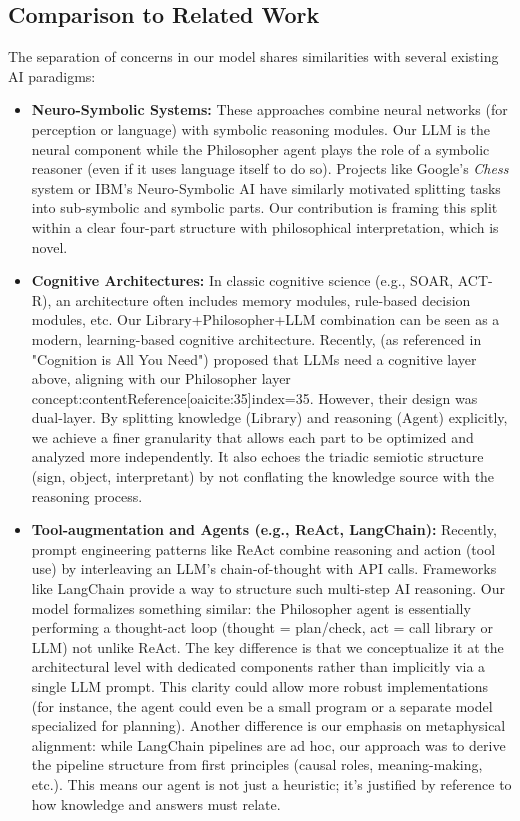\documentclass{article}
\begin{document}
\subsection{Comparison to Related Work}
The separation of concerns in our model shares similarities with several existing AI paradigms:
\begin{itemize}
    \item \textbf{Neuro-Symbolic Systems:} These approaches combine neural networks (for perception or language) with symbolic reasoning modules. Our LLM is the neural component while the Philosopher agent plays the role of a symbolic reasoner (even if it uses language itself to do so). Projects like Google’s \emph{Chess} system or IBM’s Neuro-Symbolic AI have similarly motivated splitting tasks into sub-symbolic and symbolic parts. Our contribution is framing this split within a clear four-part structure with philosophical interpretation, which is novel.
    \item \textbf{Cognitive Architectures:} In classic cognitive science (e.g., SOAR, ACT-R), an architecture often includes memory modules, rule-based decision modules, etc. Our Library+Philosopher+LLM combination can be seen as a modern, learning-based cognitive architecture. Recently, \citet{Spivack2024CogAI} (as referenced in "Cognition is All You Need") proposed that LLMs need a cognitive layer above, aligning with our Philosopher layer concept:contentReference[oaicite:35]{index=35}. However, their design was dual-layer. By splitting knowledge (Library) and reasoning (Agent) explicitly, we achieve a finer granularity that allows each part to be optimized and analyzed more independently. It also echoes the triadic semiotic structure (sign, object, interpretant) by not conflating the knowledge source with the reasoning process.
    \item \textbf{Tool-augmentation and Agents (e.g., ReAct, LangChain):} Recently, prompt engineering patterns like ReAct combine reasoning and action (tool use) by interleaving an LLM's chain-of-thought with API calls. Frameworks like LangChain provide a way to structure such multi-step AI reasoning. Our model formalizes something similar: the Philosopher agent is essentially performing a thought-act loop (thought = plan/check, act = call library or LLM) not unlike ReAct. The key difference is that we conceptualize it at the architectural level with dedicated components rather than implicitly via a single LLM prompt. This clarity could allow more robust implementations (for instance, the agent could even be a small program or a separate model specialized for planning). Another difference is our emphasis on metaphysical alignment: while LangChain pipelines are ad hoc, our approach was to derive the pipeline structure from first principles (causal roles, meaning-making, etc.). This means our agent is not just a heuristic; it's justified by reference to how knowledge and answers must relate.
\end{itemize}
\end{document}
